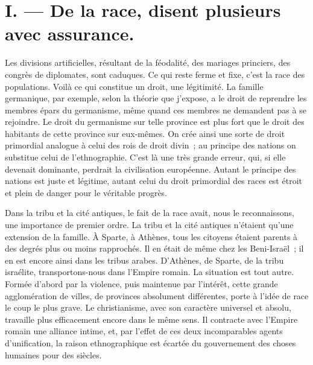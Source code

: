 \documentclass[french,twoside]{book} %
\newcommand\orgName[1]{#1}
\newcommand\placeName[1]{#1}
\begin{document}
\section[{I. — De la race, disent plusieurs avec assurance.}]{I. — De la race, disent plusieurs avec assurance.}
\noindent Les divisions artificielles, résultant de la féodalité, des mariages princiers, des congrès de diplomates, sont caduques. Ce qui reste ferme et fixe, c’est la race des populations. Voilà ce qui constitue un droit, une légitimité. La famille germanique, par exemple, selon la théorie que j’expose, a le droit de reprendre les membres épars du germanisme, même quand ces membres ne demandent pas à se rejoindre. Le droit du germanisme sur telle province est plus fort que le droit des habitants de cette province sur eux-mêmes. On crée ainsi une sorte de droit primordial analogue à celui des rois de droit divin ; au principe des nations on substitue celui de l’ethnographie. C’est là une très grande erreur, qui, si elle devenait dominante, perdrait la civilisation européenne. Autant le principe des nations est juste et légitime, autant celui du droit primordial des races est étroit et plein de danger pour le véritable progrès.\par
Dans la tribu et la cité antiques, le fait de la race avait, nous le reconnaissons, une importance de premier ordre. La tribu et la cité antiques n’étaient qu’une extension de la famille. À {\placeName Sparte}, à {\placeName Athènes}, tous les citoyens étaient parents à des degrés plus ou moins rapprochés. Il en était de même chez les {\orgName Beni-Israël} ; il en est encore ainsi dans les {\orgName tribus arabes}. D’{\placeName Athènes}, de {\placeName Sparte}, de la {\orgName tribu israélite}, transportons-nous dans l’{\orgName Empire romain}. La situation est tout autre. Formée d’abord par la violence, puis maintenue par l’intérêt, cette grande agglomération de villes, de provinces absolument différentes, porte à l’idée de race le coup le plus grave. Le christianisme, avec son caractère universel et absolu, travaille plus efficacement encore dans le même sens. Il contracte avec l’{\orgName Empire romain} une alliance intime, et, par l’effet de ces deux incomparables agents d’unification, la raison ethnographique est écartée du gouvernement des choses humaines pour des siècles.\par
\end{document}
